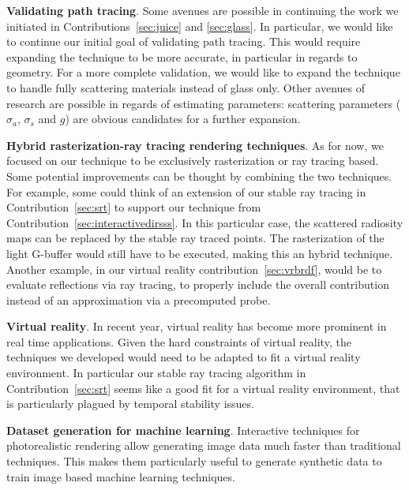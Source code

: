 \textbf{Validating path tracing}. Some avenues are possible in continuing the work we initiated in Contributions~\ref{sec:juice} and \ref{sec:glass}. In particular, we would like to continue our initial goal of validating path tracing. This would require expanding the technique to be more accurate, in particular in regards to geometry. For a more complete validation, we would like to expand the technique to handle fully scattering materials instead of glass only. Other avenues of research are possible in regards of estimating parameters: scattering parameters ($\sigma_a$, $\sigma_s$ and $g$) are obvious candidates for a further expansion.

\textbf{Hybrid rasterization-ray tracing rendering techniques}. As for now, we focused on our technique to be exclusively rasterization or ray tracing based. Some potential improvements can be thought by combining the two techniques. For example, some could think of an extension of our stable ray tracing in Contribution~\ref{sec:srt} to support our technique from Contribution~\ref{sec:interactivedirsss}. In this particular case, the scattered radiosity maps can be replaced by the stable ray traced points. The rasterization of the light G-buffer would still have to be executed, making this an hybrid technique.  Another example, in our virtual reality contribution~\ref{sec:vrbrdf}, would be to evaluate reflections via ray tracing, to properly include the overall contribution instead of an approximation via a precomputed probe.

\textbf{Virtual reality}. In recent year, virtual reality has become more prominent in real time applications. Given the hard constraints of virtual reality, the techniques we developed would need to be adapted to fit a virtual reality environment. In particular our stable ray tracing algorithm in Contribution~\ref{sec:srt} seems like a good fit for a virtual reality environment, that is particularly plagued by temporal stability issues. 

\textbf{Dataset generation for machine learning}. Interactive techniques for photorealistic rendering allow generating image data much faster than traditional techniques. This makes them particularly useful to generate synthetic data to train image based machine learning techniques.  